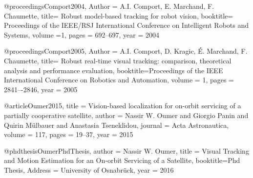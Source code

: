 @proceedings{Comport2004,
Author ={ A.I. Comport, E. Marchand, F. Chaumette},
title=  {Robust model-based tracking for robot vision},
booktitle= {Proceedings of the IEEE/RSJ International Conference on Intelligent Robots and Systems},
volume ={1},
pages = {692--697},
year = {2004}
}


@proceedings{Comport2005,
Author = {A.I. Comport, D. Kragic, É. Marchand, F. Chaumette},
title=  {Robust real-time visual tracking: comparison, theoretical analysis and performance evaluation},
booktitle={Proceedings of the IEEE International Conference on Robotics and Automation},
volume = {1},
pages = {2841–-2846},
year = {2005}
}

@article{Oumer2015,
title = {Vision-based localization for on-orbit servicing of a partially cooperative satellite},
author = {Nassir W. Oumer and Giorgio Panin and Quirin Mülbauer and Anastasia Tseneklidou},
journal = {Acta Astronautica},
volume = {117},
pages = {19--37},
year = {2015}
}

@phdthesis{OumerPhdThesis,
author = {Nassir W. Oumer}, 
title = {Visual Tracking and Motion Estimation for an On-orbit Servicing of a Satellite},
booktitle={Phd Thesis},
Address = {University of Osnabrück},
year = {2016}
}
